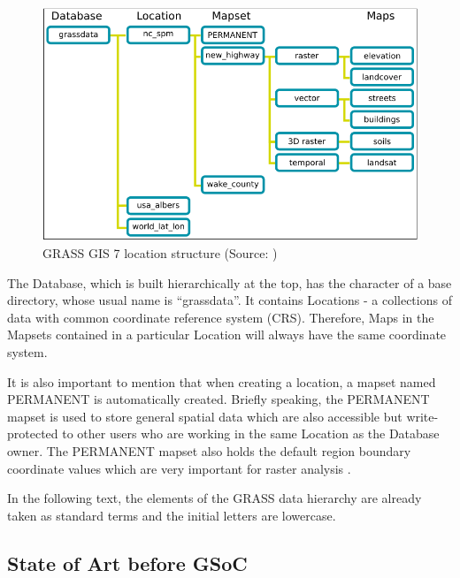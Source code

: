 \documentclass[a4paper,10pt,twoside]{article}
\begin{document}
\vspace{0.3cm}
\begin{figure}[hbt!]
\begin{center}
\includegraphics[width=14cm]{../pictures/grass_data_hiearchy.png} 
\caption[GRASS GIS 7 location structure]{GRASS GIS 7 location structure (Source: \cite{hierarchy})}
\label{fig:grass_data_hierarchy}
\end{center}
\end{figure}

\noindent The Database, which is built hierarchically at the top, has the character of a base directory, whose usual name is ``grassdata''. It contains Locations - a collections of data with common coordinate reference system (CRS). Therefore, Maps in the Mapsets contained in a particular Location will always have the same coordinate system.

It is also important to mention that when creating a location, a mapset named PERMANENT is automatically created. Briefly speaking, the PERMANENT mapset is used to store general spatial data which are also accessible but write-protected to other users who are working in the same Location as the Database owner. The PERMANENT mapset also holds the default region boundary coordinate values which are very important for raster analysis \cite{hierarchy}. 

In the following text, the elements of the GRASS data hierarchy are already taken as standard terms and the initial letters are lowercase.

\newpage
\vspace*{-1cm}
\subsection{State of Art before GSoC}
\label{sec:beforeGSoC}
\end{document}
